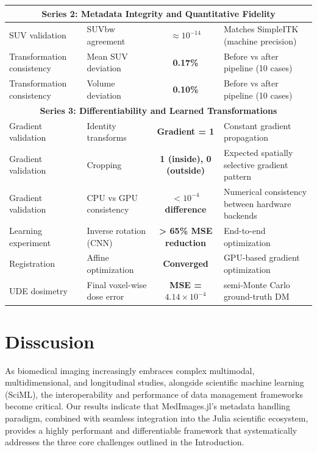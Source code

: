 \documentclass[a4paper,10pt,preprint]{elsarticle}
\begin{document}
\begin{table}[H]
\begin{tabularx}{\textwidth}{|l|>{\raggedright\arraybackslash}X|c|>{\raggedright\arraybackslash}X|}
\multicolumn{4}{|c|}{\textbf{Series 2: Metadata Integrity and Quantitative Fidelity}} \\
\hline
SUV validation & SUVbw agreement & \textbf{$\approx 10^{-14}$} & Matches SimpleITK (machine precision) \\
Transformation consistency & Mean SUV deviation & \textbf{0.17\%} & Before vs after pipeline (10 cases) \\
Transformation consistency & Volume deviation & \textbf{0.10\%} & Before vs after pipeline (10 cases) \\
\hline
\multicolumn{4}{|c|}{\textbf{Series 3: Differentiability and Learned Transformations}} \\
\hline
Gradient validation & Identity transforms & \textbf{Gradient = 1} & Constant gradient propagation \\
Gradient validation & Cropping & \textbf{1 (inside), 0 (outside)} & Expected spatially selective gradient pattern\\
Gradient validation & CPU vs GPU consistency & \textbf{$< 10^{-4}$ difference} & Numerical consistency between hardware backends\\
Learning experiment & Inverse rotation (CNN) & \textbf{> 65\% MSE reduction} & End-to-end optimization\\
Registration & Affine optimization & \textbf{Converged} & GPU-based gradient optimization \\
UDE dosimetry& Final voxel-wise dose error & \textbf{MSE = $4.14 \times 10^{-4}$} & semi-Monte Carlo ground-truth DM\\
\hline

\end{tabularx}
\end{table}


\section{ Disscusion}

As biomedical imaging increasingly embraces complex multimodal, multidimensional, and longitudinal studies, alongside scientific machine learning (SciML), the interoperability and performance of data management frameworks become critical. Our results indicate that MedImages.jl’s metadata handling paradigm, combined with seamless integration into the Julia scientific ecosystem, provides a highly performant and differentiable framework that systematically addresses the three core challenges outlined in the Introduction.  
\end{document}
